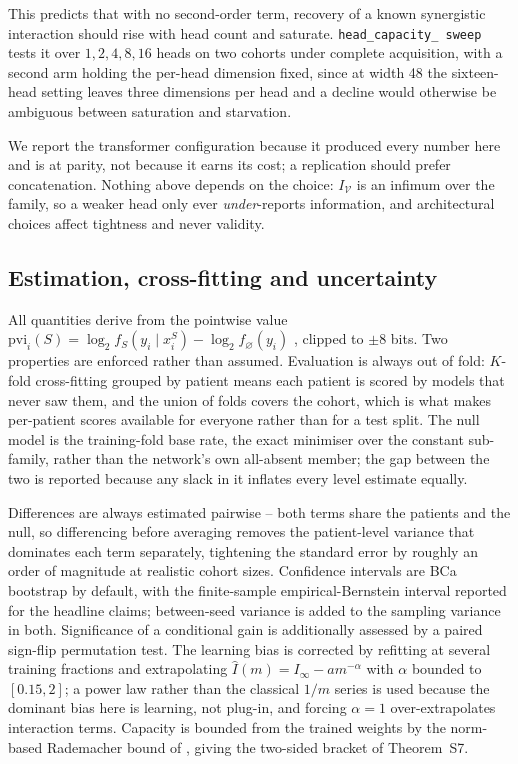 \documentclass[11pt]{article}
\theoremstyle{definition}
\theoremstyle{remark}
\newcommand{\Vc}{\mathcal{V}}
\newcommand{\IV}{I_{\Vc}}
\newcommand{\pvi}{\mathrm{pvi}}
\begin{document}
This predicts that with no second-order term, recovery of a known synergistic
interaction should rise with head count and saturate. \texttt{head\_capacity\_%
sweep} tests it over $1,2,4,8,16$ heads on two cohorts under complete
acquisition, with a second arm holding the per-head dimension fixed, since at
width 48 the sixteen-head setting leaves three dimensions per head and a decline
would otherwise be ambiguous between saturation and starvation.

We report the transformer configuration because it produced every number here
and is at parity, not because it earns its cost; a replication should prefer
concatenation. Nothing above depends on the choice: $\IV$ is an infimum over
the family, so a weaker head only ever \emph{under}-reports information, and
architectural choices affect tightness and never validity.

\subsection{Estimation, cross-fitting and uncertainty}

All quantities derive from the pointwise value
$\pvi_i(S) = \log_2 f_S(y_i\mid x_i^S) - \log_2 f_\varnothing(y_i)$
\citep{ethayarajh2022pvi}, clipped to $\pm 8$ bits. Two properties are enforced
rather than assumed. Evaluation is always out of fold: $K$-fold cross-fitting
grouped by patient \citep{chernozhukov2018dml} means each patient is scored by
models that never saw them, and the union of folds covers the cohort, which is
what makes per-patient scores available for everyone rather than for a test
split. The null model is the training-fold base rate, the exact minimiser over
the constant sub-family, rather than the network's own all-absent member; the
gap between the two is reported because any slack in it inflates every level
estimate equally.

Differences are always estimated pairwise -- both terms share the patients and
the null, so differencing before averaging removes the patient-level variance
that dominates each term separately, tightening the standard error by roughly an
order of magnitude at realistic cohort sizes. Confidence intervals are BCa
bootstrap by default, with the finite-sample empirical-Bernstein interval
\citep{maurer2009empirical} reported for the headline claims; between-seed
variance is added to the sampling variance in both. Significance of a
conditional gain is additionally assessed by a paired sign-flip permutation
test. The learning bias is corrected by refitting at several training fractions
and extrapolating $\hat I(m) = I_\infty - am^{-\alpha}$ with $\alpha$ bounded to
$[0.15, 2]$; a power law rather than the classical $1/m$ series is used because
the dominant bias here is learning, not plug-in, and forcing $\alpha=1$
over-extrapolates interaction terms. Capacity is bounded from the trained
weights by the norm-based Rademacher bound of \citet{golowich2018size}, giving
the two-sided bracket of Theorem~S7.
\end{document}

